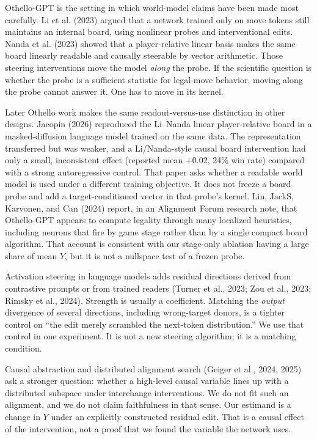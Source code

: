 \documentclass[11pt]{article}
\begin{document}
Othello-GPT is the setting in which world-model claims have been made most carefully. Li et al. (2023) argued that a network trained only on move tokens still maintains an internal board, using nonlinear probes and interventional edits. Nanda et al. (2023) showed that a player-relative linear basis makes the same board linearly readable and causally steerable by vector arithmetic. Those steering interventions move the model \emph{along} the probe. If the scientific question is whether the probe is a sufficient statistic for legal-move behavior, moving along the probe cannot answer it. One has to move in its kernel.

Later Othello work makes the same readout-versus-use distinction in other designs. Jacopin (2026) reproduced the Li--Nanda linear player-relative board in a masked-diffusion language model trained on the same data. The representation transferred but was weaker, and a Li/Nanda-style causal board intervention had only a small, inconsistent effect (reported mean \(+0.02\), 24\% win rate) compared with a strong autoregressive control. That paper asks whether a readable world model is used under a different training objective. It does not freeze a board probe and add a target-conditioned vector in that probe's kernel. Lin, JackS, Karvonen, and Can (2024) report, in an Alignment Forum research note, that Othello-GPT appears to compute legality through many localized heuristics, including neurons that fire by game stage rather than by a single compact board algorithm. That account is consistent with our stage-only ablation having a large share of mean \(Y\), but it is not a nullspace test of a frozen probe.

Activation steering in language models adds residual directions derived from contrastive prompts or from trained readers (Turner et al., 2023; Zou et al., 2023; Rimsky et al., 2024). Strength is usually a coefficient. Matching the \emph{output} divergence of several directions, including wrong-target donors, is a tighter control on ``the edit merely scrambled the next-token distribution.'' We use that control in one experiment. It is not a new steering algorithm; it is a matching condition.

Causal abstraction and distributed alignment search (Geiger et al., 2024, 2025) ask a stronger question: whether a high-level causal variable lines up with a distributed subspace under interchange interventions. We do not fit such an alignment, and we do not claim faithfulness in that sense. Our estimand is a change in \(Y\) under an explicitly constructed residual edit. That is a causal effect of the intervention, not a proof that we found the variable the network uses.
\end{document}

